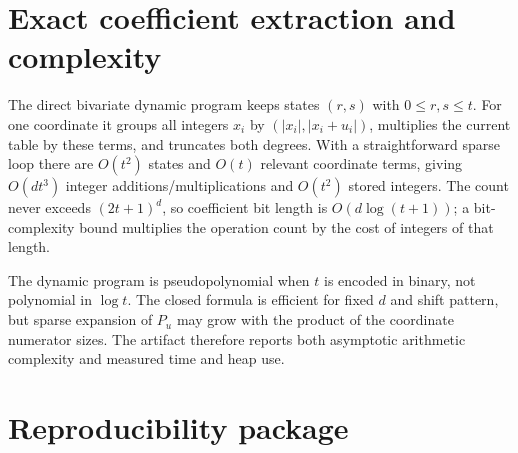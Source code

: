 \documentclass[pdflatex,sn-mathphys-num]{sn-jnl}
\theoremstyle{thmstyleone}
\theoremstyle{thmstylethree}
\theoremstyle{thmstyletwo}
\begin{document}
\begin{appendices}
\section{Exact coefficient extraction and complexity}
\label{app:exact-complexity}

The direct bivariate dynamic program keeps states $(r,s)$ with
$0\le r,s\le t$.  For one coordinate it groups all integers $x_i$ by
$(|x_i|,|x_i+u_i|)$, multiplies the current table by these terms, and
truncates both degrees.  With a straightforward sparse loop there are
$O(t^2)$ states and $O(t)$ relevant coordinate terms, giving $O(dt^3)$
integer additions/multiplications and $O(t^2)$ stored integers.  The count
never exceeds $(2t+1)^d$, so coefficient bit length is $O(d\log(t+1))$; a
bit-complexity bound multiplies the operation count by the cost of integers of
that length.

The dynamic program is pseudopolynomial when $t$ is encoded in binary, not
polynomial in $\log t$.  The closed formula is efficient for fixed $d$ and
shift pattern, but sparse expansion of $P_u$ may grow with the product of the
coordinate numerator sizes.  The artifact therefore reports both asymptotic
arithmetic complexity and measured time and heap use.



\section{Reproducibility package}
\label{app:repro}


\end{appendices}
\end{document}

